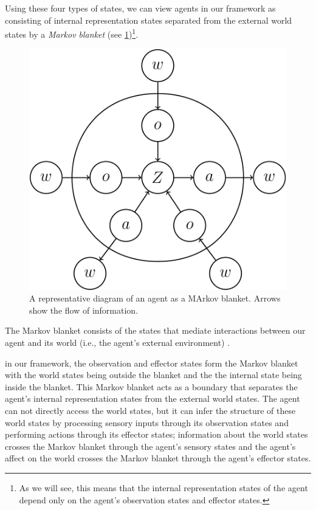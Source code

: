 Using these four types of states, we can view agents in our framework as consisting of internal representation states separated from the external world states by a \emph{Markov blanket} (see \cref{fig:markov_blanket})\footnote{
As we will see, this means that the internal representation states of the agent depend only on the agent's observation states and effector states.
}.

\begin{figure}[H]
	\centering
	\includegraphics[width=0.5\linewidth]{2MathematicalFramework/Images/markov_blanket.png}
	\caption{
    A representative diagram of an agent as a MArkov blanket.
		Arrows show the flow of information.
	}
	\label{fig:markov_blanket}
\end{figure}

The Markov blanket consists of the states that mediate interactions between our agent and its world (i.e., the agent's external environment) \autocite{Ramstead2020}.

 in our framework, the observation and effector states form the Markov blanket with the world states being outside the blanket and the the internal state being inside the blanket.
This Markov blanket acts as a boundary that separates the agent's internal representation states from the external world states.
The agent can not directly access the world states, but it can infer the structure of these world states by processing sensory inputs through its observation states and performing actions through its effector states; information about the world states crosses the Markov blanket through the agent's sensory states and the agent's affect on the world crosses the Markov blanket through the agent's effector states.

